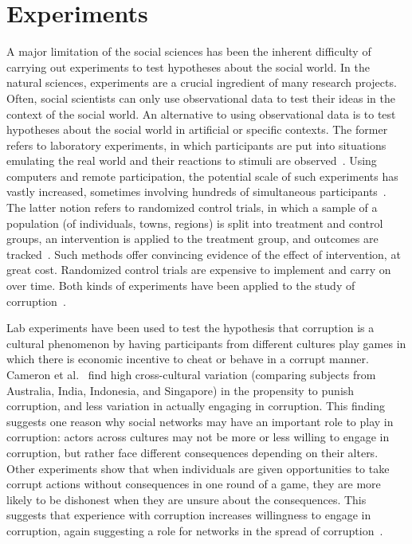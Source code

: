 
\section{Experiments}

A major limitation of the social sciences has been the inherent difficulty of carrying out experiments to test hypotheses about the social world. In the natural sciences, experiments are a crucial ingredient of many research projects. Often, social scientists can only use observational data to test their ideas in the context of the social world. An alternative to using observational data is to test hypotheses about the social world in artificial or specific contexts. The former refers to laboratory experiments, in which participants are put into situations emulating the real world and their reactions to stimuli are observed~\cite{camerer2011advances}. Using computers and remote participation, the potential scale of such experiments has vastly increased, sometimes involving hundreds of simultaneous participants~\cite{arechar2018conducting}. The latter notion refers to randomized control trials, in which a sample of a population (of individuals, towns, regions) is split into treatment and control groups, an intervention is applied to the treatment group, and outcomes are tracked~\cite{duflo2007using}. Such methods offer convincing evidence of the effect of intervention, at great cost. Randomized control trials are expensive to implement and carry on over time. Both kinds of experiments have been applied to the study of corruption~\cite{abbink2006}.

Lab experiments have been used to test the hypothesis that corruption is a cultural phenomenon by having participants from different cultures play games in which there is economic incentive to cheat or behave in a corrupt manner. Cameron et al.~\cite{Cameron2009} find high cross-cultural variation (comparing subjects from Australia, India, Indonesia, and Singapore) in the propensity to punish corruption, and less variation in actually engaging in corruption. This finding suggests one reason why social networks may have an important role to play in corruption: actors across cultures may not be more or less willing to engage in corruption, but rather face different consequences depending on their alters. Other experiments show that when individuals are given opportunities to take corrupt actions without consequences in one round of a game, they are more likely to be dishonest when they are unsure about the consequences. This suggests that experience with corruption increases willingness to engage in corruption, again suggesting a role for networks in the spread of corruption~\cite{Shalvi2016,Gachter2016}.


